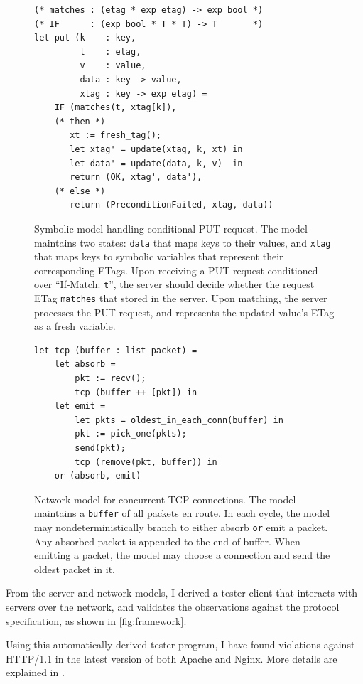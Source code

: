 \documentclass{article}
\newcommand{\ilc}[1]{\lstinline[style=customcoq]{#1}}
\theoremstyle{definition}
\begin{document}
\begin{figure}
\begin{lstlisting}[style=customcoq]
(* matches : (etag * exp etag) -> exp bool *)
(* IF      : (exp bool * T * T) -> T       *)
let put (k    : key,
         t    : etag,
         v    : value,
         data : key -> value,
         xtag : key -> exp etag) =
    IF (matches(t, xtag[k]),
    (* then *)
       xt := fresh_tag();
       let xtag' = update(xtag, k, xt) in
       let data' = update(data, k, v)  in
       return (OK, xtag', data'),
    (* else *)
       return (PreconditionFailed, xtag, data))
\end{lstlisting}
\caption{Symbolic model handling conditional PUT request.  The model maintains
  two states: \ilc{data} that maps keys to their values, and \ilc{xtag} that
  maps keys to symbolic variables that represent their corresponding ETags.
  Upon receiving a PUT request conditioned over ``If-Match: \ilc{t}'', the
  server should decide whether the request ETag \ilc{matches} that stored in the
  server.  Upon matching, the server processes the PUT request, and represents
  the updated value's ETag as a fresh variable.
}
\label{fig:if-match-model}
\end{figure}

\begin{figure}
\begin{lstlisting}[style=customcoq]
let tcp (buffer : list packet) =
    let absorb =
        pkt := recv();
        tcp (buffer ++ [pkt]) in
    let emit =
        let pkts = oldest_in_each_conn(buffer) in
        pkt := pick_one(pkts);
        send(pkt);
        tcp (remove(pkt, buffer)) in
    or (absorb, emit)
\end{lstlisting}
\caption{Network model for concurrent TCP connections.  The model maintains a
  \ilc{buffer} of all packets en route.  In each cycle, the model may
  nondeterministically branch to either absorb \ilc{or} emit a packet.  Any
  absorbed packet is appended to the end of buffer.  When emitting a packet, the
  model may choose a connection and send the oldest packet in it.  }
\label{fig:tcp-model}
\end{figure}

From the server and network models, I derived a tester client that interacts
with servers over the network, and validates the observations against the
protocol specification, as shown in \autoref{fig:framework}.


Using this automatically derived tester program, I have found violations against
HTTP/1.1 in the latest version of both Apache and Nginx.  More details are
explained in \textcite{issta21}.
\end{document}
